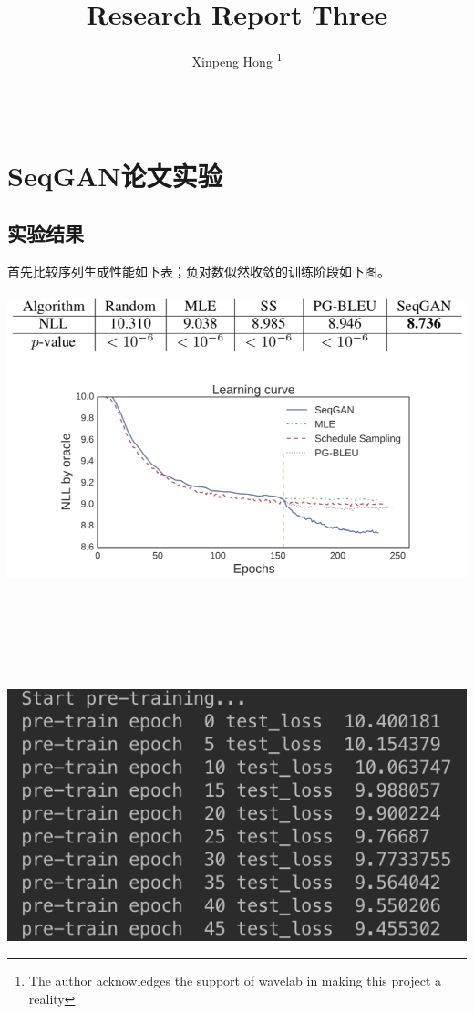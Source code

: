 \documentclass[11pt,a4paper]{ctexart}
\title{Research Report Three}
\author{Xinpeng Hong
	\thanks{The author acknowledges the support of wavelab in
		making this project a reality}\\
	\\\\
}
\begin{document}
\makecover
\maketitle
	

\section{SeqGAN论文实验}
\subsection{实验结果}
\noindent 首先比较序列生成性能如下表；负对数似然收敛的训练阶段如下图。\\\\
\includegraphics[scale=1]{1.png}\\\\\\\\\\\\\\
\indent \indent \indent \indent \includegraphics[scale=1]{2.png}\\
\end{document}
